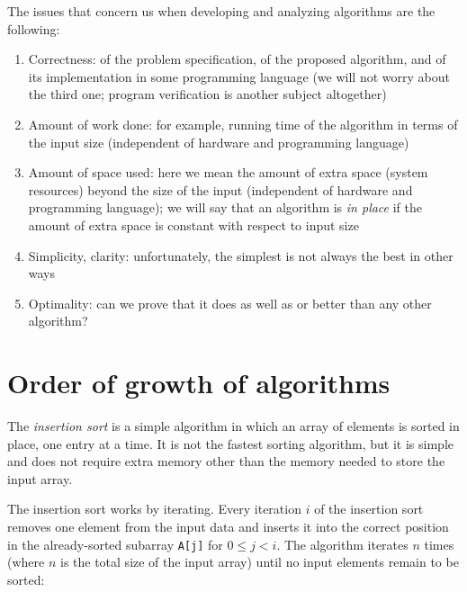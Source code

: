 \documentclass[justified, sixbynine]{tufte-book}
\def\ft{\small\tt}
\theoremstyle{plain}%
\newtheorem * {corollary}{Corollary}
\theoremstyle{definition}
\theoremstyle{remark}
\newtheorem * {remark}{Remark}
\newtheorem * {note}{Note}
\begin{document}
\begin{fullwidth}
The issues that concern us when developing and analyzing algorithms are the following:

\begin{enumerate}
\item  Correctness: of the problem specification, of the proposed algorithm, 
and of its implementation in some programming language (we will not worry
about the third one; program verification is another subject altogether)

\item  Amount of work done: for example, running time of the algorithm in terms of
the input size (independent of hardware and programming language)

\item  Amount of space used: here we mean the amount of extra space (system resources) beyond
the size of the input (independent of hardware and programming language);
we will say that an algorithm is {\em in place} if the amount of extra space
is constant with respect to input size

\item  Simplicity, clarity: unfortunately, the simplest is not always the
best in other ways

\item  Optimality: can we prove that it does as well as or better than any other algorithm?
\end{enumerate}

\goodbreak\section{Order of growth of algorithms}

\index{$\Theta$}\index{$\Omega$}\index{$\omega$}


The {\it insertion sort} is a simple algorithm in which an array of elements is sorted in place, one entry at a time. It is not the fastest sorting algorithm, but it is simple and does not require extra memory other than the memory needed to store the input array.

The insertion sort works by iterating. Every iteration $i$ of the insertion sort removes one element from the input data and inserts it into the correct position in the already-sorted subarray {\ft A[j]} for $0 \le j < i$. The algorithm iterates $n$ times (where $n$ is the total size of the input array) until no input elements remain to be sorted:


\end{fullwidth}
\end{document}
